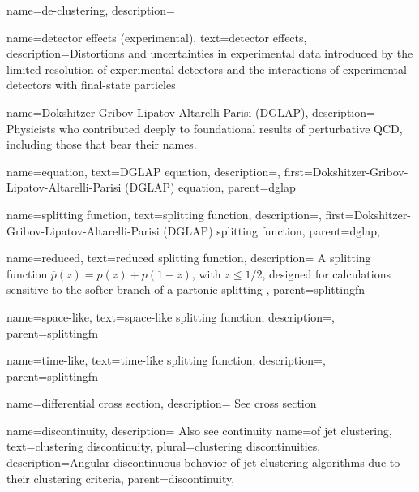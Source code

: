 {
    name=de-clustering,
    description={
    }
}



{
    name=detector effects (experimental),
    text=detector effects,
    description={Distortions and uncertainties in experimental data introduced by the limited resolution of experimental detectors and the interactions of experimental detectors with final-state particles}
}



{
    name=Dokshitzer-Gribov-Lipatov-Altarelli-Parisi (DGLAP),
    description={
        Physicists who contributed deeply to foundational results of perturbative QCD, including those that bear their names.
    }
}

    {
      name=equation,
      text=DGLAP equation,
      description={},
      first=Dokshitzer-Gribov-Lipatov-Altarelli-Parisi (DGLAP) equation,
      parent=dglap
    }

    {
      name=splitting function,
      text=splitting function,
      description={},
      first=Dokshitzer-Gribov-Lipatov-Altarelli-Parisi (DGLAP) splitting function,
      parent=dglap,
    }

        {
          name=reduced,
          text=reduced splitting function,
          description={
            A splitting function \(\overline{p}(z) = p(z) + p(1-z)\), with \(z \leq 1/2\), designed for calculations sensitive to the softer branch of a partonic splitting
          },
          parent=splittingfn
        }

        {
          name=space-like,
          text=space-like splitting function,
          description={},
          parent=splittingfn
        }

        {
          name=time-like,
          text=time-like splitting function,
          description={},
          parent=splittingfn
        }



{
    name=differential cross section,
    description={
        See cross section
    }
}


{
    name=discontinuity,
    description={
        Also see continuity
    }
}
    {
        name=of jet clustering,
        text={clustering discontinuity},
        plural={clustering discontinuities},
        description={Angular-discontinuous behavior of jet clustering algorithms due to their clustering criteria},
        parent=discontinuity,
    }

